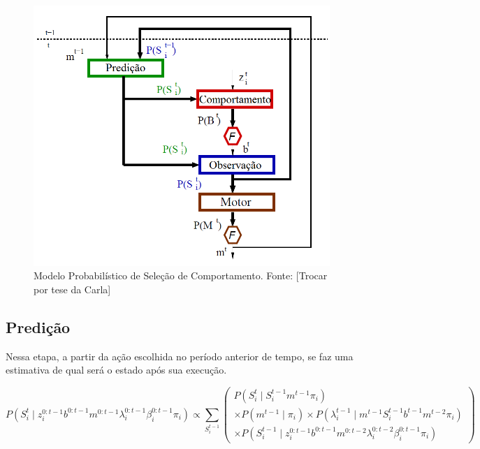 \begin{figure}[h]
    \centering
    \includegraphics[width=120mm]{images/modelo_probabilistico-carla}
    \caption{\label{img:ModeloProbabilisticoCarla}Modelo Probabilístico de Seleção de Comportamento. Fonte: \cite{INCA2005} [Trocar por tese da Carla]}
\end{figure}

\subsection{Predição}

Nessa etapa, a partir da ação escolhida no período anterior de tempo, se faz uma estimativa de qual será o estado após sua execução.

\begin{equation}
    P \left( S_i^t \mid z_i^{0: t-1} b^{0: t-1} m^{0: t-1} \lambda_i^{0: t-1} \beta_i^{0: t-1} \pi_i \right) \propto \sum\limits_{S_i^{t-1}}
        \left(
            \begin{array}{l}
                P \left( S_i^t \mid S_i^{t-1} m^{t-1} \pi_i \right) \\
                \times P \left( m^{t-1} \mid \pi_i \right) \times P \left( \lambda_i^{t-1} \mid m^{t-1} S_i^{t-1} b^{t-1} m^{t-2} \pi_i \right)\\
                \times P \left( S_i^{t-1} \mid z_i^{0: t-1} b^{0: t-1} m^{0: t-2} \lambda_i^{0: t-2} \beta_i^{0: t-1} \pi_i \right)
            \end{array}
        \right)
\end{equation}


